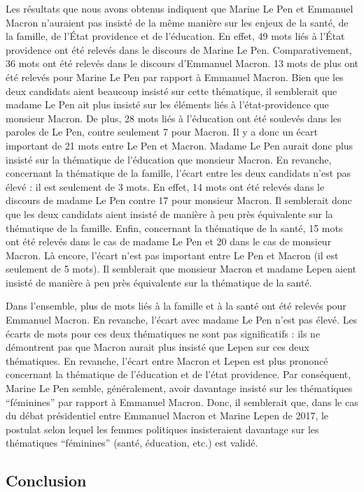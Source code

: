 \documentclass[
  letterpaper,
  DIV=11,
  numbers=noendperiod]{scrartcl}
\begin{document}
Les résultats que nous avons obtenus indiquent que Marine Le Pen et
Emmanuel Macron n'auraient pas insisté de la même manière sur les enjeux
de la santé, de la famille, de l'État providence et de l'éducation. En
effet, 49 mots liés à l'État providence ont été relevés dans le discours
de Marine Le Pen. Comparativement, 36 mots ont été relevés dans le
discours d'Emmanuel Macron. 13 mots de plus ont été relevés pour Marine
Le Pen par rapport à Emmanuel Macron. Bien que les deux candidats aient
beaucoup insisté sur cette thématique, il semblerait que madame Le Pen
ait plus insisté sur les éléments liés à l'état-providence que monsieur
Macron. De plus, 28 mots liés à l'éducation ont été soulevés dans les
paroles de Le Pen, contre seulement 7 pour Macron. Il y a donc un écart
important de 21 mots entre Le Pen et Macron. Madame Le Pen aurait donc
plus insisté sur la thématique de l'éducation que monsieur Macron. En
revanche, concernant la thématique de la famille, l'écart entre les deux
candidats n'est pas élevé : il est seulement de 3 mots. En effet, 14
mots ont été relevés dans le discours de madame Le Pen contre 17 pour
monsieur Macron. Il semblerait donc que les deux candidats aient insisté
de manière à peu près équivalente sur la thématique de la famille.
Enfin, concernant la thématique de la santé, 15 mots ont été relevés
dans le cas de madame Le Pen et 20 dans le cas de monsieur Macron. Là
encore, l'écart n'est pas important entre Le Pen et Macron (il est
seulement de 5 mots). Il semblerait que monsieur Macron et madame Lepen
aient insisté de manière à peu près équivalente sur la thématique de la
santé.

Dans l'ensemble, plus de mots liés à la famille et à la santé ont été
relevés pour Emmanuel Macron. En revanche, l'écart avec madame Le Pen
n'est pas élevé. Les écarts de mots pour ces deux thématiques ne sont
pas significatifs : ils ne démontrent pas que Macron aurait plus insisté
que Lepen sur ces deux thématiques. En revanche, l'écart entre Macron et
Lepen est plus prononcé concernant la thématique de l'éducation et de
l'état providence. Par conséquent, Marine Le Pen semble, généralement,
avoir davantage insisté sur les thématiques ``féminines'' par rapport à
Emmanuel Macron. Donc, il semblerait que, dans le cas du débat
présidentiel entre Emmanuel Macron et Marine Lepen de 2017, le postulat
selon lequel les femmes politiques insisteraient davantage sur les
thématiques ``féminines'' (santé, éducation, etc.) est validé.

\hypertarget{conclusion}{%
\subsection{Conclusion}\label{conclusion}}
\end{document}

